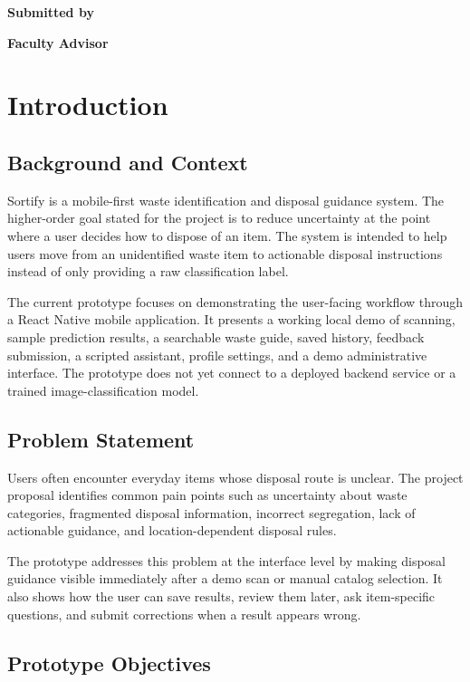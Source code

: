 \documentclass[12pt,a4paper]{report}
\author{%
  \texttt{1024160015} Daksh Aggarwal, CSED \\
  \texttt{1024160002} Mankirat Singh, CSED \\
  \texttt{1024160028} Saket Gatyan, CSED%
}
\makeatletter
\renewcommand{\maketitle}{%
  \begin{titlepage}
    \centering
    \vspace*{1.2cm}
    {\Large\bfseries \ReportHeader\par}
    \vspace{2.2cm}
    {\huge\bfseries \ReportProjectTitle\par}
    \vspace{0.6cm}
    {\Large \ReportProjectSubTitle\par}
    \vspace{1.8cm}
    {\large\ReportSubText\par}
    \vspace{1.0cm}
    {\large\bfseries Submitted by\par}
    \vspace{0.4cm}
    {\large\@author\par}
    \vspace{0.8cm}
    {\large\bfseries Faculty Advisor\par}
    \vspace{0.2cm}
    {\large\ReportAdvisorName\par}
    \vfill
    {\large\ReportFooterText\par}
  \end{titlepage}
}
\makeatother
\begin{document}
\maketitle
\tableofcontents

\chapter{Introduction}

\section{Background and Context}

Sortify is a mobile-first waste identification and disposal guidance system. The higher-order goal stated for the project is to reduce uncertainty at the point where a user decides how to dispose of an item. The system is intended to help users move from an unidentified waste item to actionable disposal instructions instead of only providing a raw classification label.

The current prototype focuses on demonstrating the user-facing workflow through a React Native mobile application. It presents a working local demo of scanning, sample prediction results, a searchable waste guide, saved history, feedback submission, a scripted assistant, profile settings, and a demo administrative interface. The prototype does not yet connect to a deployed backend service or a trained image-classification model.

\section{Problem Statement}

Users often encounter everyday items whose disposal route is unclear. The project proposal identifies common pain points such as uncertainty about waste categories, fragmented disposal information, incorrect segregation, lack of actionable guidance, and location-dependent disposal rules.

The prototype addresses this problem at the interface level by making disposal guidance visible immediately after a demo scan or manual catalog selection. It also shows how the user can save results, review them later, ask item-specific questions, and submit corrections when a result appears wrong.

\section{Prototype Objectives}
\end{document}
